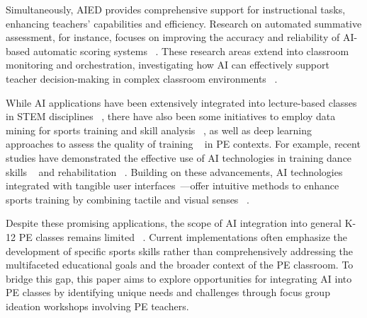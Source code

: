 Simultaneously, AIED provides comprehensive support for instructional tasks, enhancing teachers' capabilities and efficiency. Research on automated summative assessment, for instance, focuses on improving the accuracy and reliability of AI-based automatic scoring systems ~\cite{hsu2021attitudes}. These research areas extend into classroom monitoring and orchestration, investigating how AI can effectively support teacher decision-making in complex classroom environments ~\cite{song2021review, vanlehn2021can, lee2024investigating}.

While AI applications have been extensively integrated into lecture-based classes in STEM disciplines ~\cite{bates2020can, kabudi2021ai}, there have also been some initiatives to employ data mining for sports training and skill analysis ~\cite{pan2019big}, as well as deep learning approaches to assess the quality of training ~\cite{wang2022evaluation} in PE contexts. For example, recent studies have demonstrated the effective use of AI technologies in training dance skills ~\cite{wang2024artificial, feng2022automatic} and rehabilitation ~\cite{jacob2021ai, vourganas2020individualised}. Building on these advancements, AI technologies integrated with tangible user interfaces~\cite{bakker2012embodied}—offer intuitive methods to enhance sports training by combining tactile and visual senses ~\cite{gallud2022use, nacher2015game}. 

Despite these promising applications, the scope of AI integration into general K-12 PE classes remains limited ~\cite{edtech_ai_k12_2023}. Current implementations often emphasize the development of specific sports skills rather than comprehensively addressing the multifaceted educational goals and the broader context of the PE classroom. To bridge this gap, this paper aims to explore opportunities for integrating AI into PE classes by identifying unique needs and challenges through focus group ideation workshops involving PE teachers.


